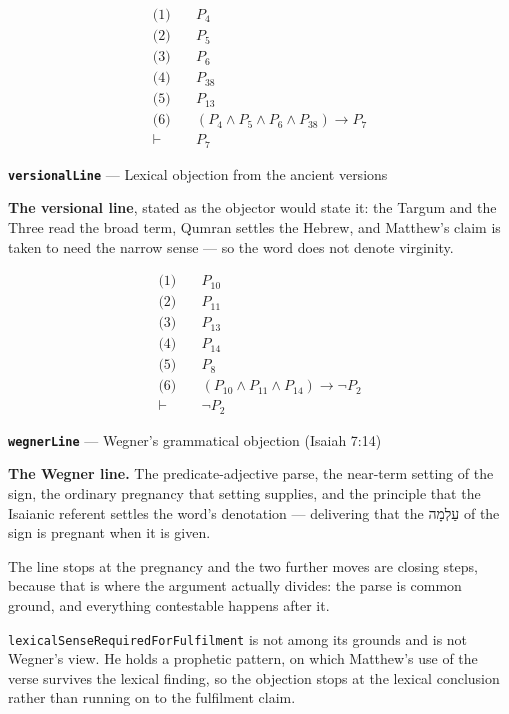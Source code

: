 \documentclass[11pt]{article}
\begin{document}
\begin{align*}
  \text{(1)} \quad & P_{4} \\
  \text{(2)} \quad & P_{5} \\
  \text{(3)} \quad & P_{6} \\
  \text{(4)} \quad & P_{38} \\
  \text{(5)} \quad & P_{13} \\
  \text{(6)} \quad & (P_{4} \land P_{5} \land P_{6} \land P_{38}) \rightarrow P_{7} \\
  \vdash \quad & P_{7}
\end{align*}
\par\medskip\noindent\textbf{\texttt{versional\allowbreak{}Line}} --- Lexical objection from the ancient versions\par\nobreak\noindent
\textbf{The versional line}, stated as the objector would state it: the Targum and the Three read the broad term, Qumran settles the Hebrew, and Matthew's claim is taken to need the narrow sense — so the word does not denote virginity.

\begin{align*}
  \text{(1)} \quad & P_{10} \\
  \text{(2)} \quad & P_{11} \\
  \text{(3)} \quad & P_{13} \\
  \text{(4)} \quad & P_{14} \\
  \text{(5)} \quad & P_{8} \\
  \text{(6)} \quad & (P_{10} \land P_{11} \land P_{14}) \rightarrow \lnot P_{2} \\
  \vdash \quad & \lnot P_{2}
\end{align*}
\par\medskip\noindent\textbf{\texttt{wegner\allowbreak{}Line}} --- Wegner's grammatical objection (Isaiah 7:14)\par\nobreak\noindent
\textbf{The Wegner line.} The predicate-adjective parse, the near-term setting of the sign, the ordinary pregnancy that setting supplies, and the principle that the Isaianic referent settles the word's denotation — delivering that the עַלְמָה of the sign is pregnant when it is given.

The line stops at the pregnancy and the two further moves are closing steps, because that is where the argument actually divides: the parse is common ground, and everything contestable happens after it.

\texttt{lexical\allowbreak{}Sense\allowbreak{}Required\allowbreak{}For\allowbreak{}Fulfilment} is not among its grounds and is not Wegner's view. He holds a prophetic pattern, on which Matthew's use of the verse survives the lexical finding, so the objection stops at the lexical conclusion rather than running on to the fulfilment claim.
\end{document}
